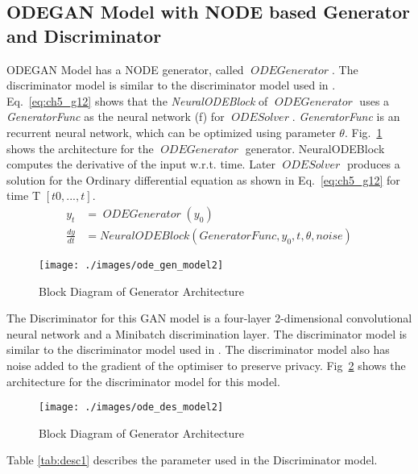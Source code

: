 \documentclass{article}
\DeclareMathOperator{\ODEGenerator}{\textit{ODEGenerator}}
\DeclareMathOperator{\ODESOLVER}{\textit{ODESolver}}
\begin{document}
\subsection{ODEGAN Model with NODE based Generator and Discriminator}
\label{sec:modelb}
ODEGAN Model has a NODE generator, called $\ODEGenerator$. The discriminator model is similar to the discriminator model used in \cite{delaney2019synthesis}. Eq.~\eqref{eq:ch5_g12} shows that the \textit{NeuralODEBlock} of $\ODEGenerator$ uses a \textit{GeneratorFunc} as the neural network (f) for $\ODESOLVER$.  \textit{GeneratorFunc} is an recurrent neural network, which can be optimized using parameter $\theta$. Fig.~\ref{fig:model2_gen} shows the architecture for the $\ODEGenerator$ generator. NeuralODEBlock computes the derivative of the input w.r.t. time. Later $\ODESOLVER$ produces a solution for the Ordinary differential equation as shown in Eq.~\eqref{eq:ch5_g12} for time T $[t0, ..., t]$. 
\begin{subequations}
\label{eq:ch5_odegenerator}
\begin{align}
\label{eq:ch5_g1}
y_{t}  &= \ODEGenerator(y_0)
\\
\label{eq:ch5_g12}
\frac{dy}{dt} &= NeuralODEBlock(\textit{GeneratorFunc}, y_0, t, \theta, \textit{noise})
\end{align}
\end{subequations}

\begin{figure}
    \centering
    \texttt{[image: ./images/ode\_gen\_model2]}
    \caption{Block Diagram of Generator Architecture}
    \label{fig:model2_gen}
\end{figure}


The Discriminator for this GAN model is a four-layer 2-dimensional convolutional neural network and a Minibatch discrimination layer. The discriminator model is similar to the discriminator model used in \cite{delaney2019synthesis}. The discriminator model also has noise added to the gradient of the optimiser to preserve privacy. Fig~\ref{fig:model2_des} shows the architecture for the discriminator model for this model. 


\begin{figure}
    \centering
    \texttt{[image: ./images/ode\_des\_model2]}
    \caption{Block Diagram of Generator Architecture}
    \label{fig:model2_des}
\end{figure}

Table \ref{tab:desc1} describes the parameter used in the Discriminator model.
\end{document}
